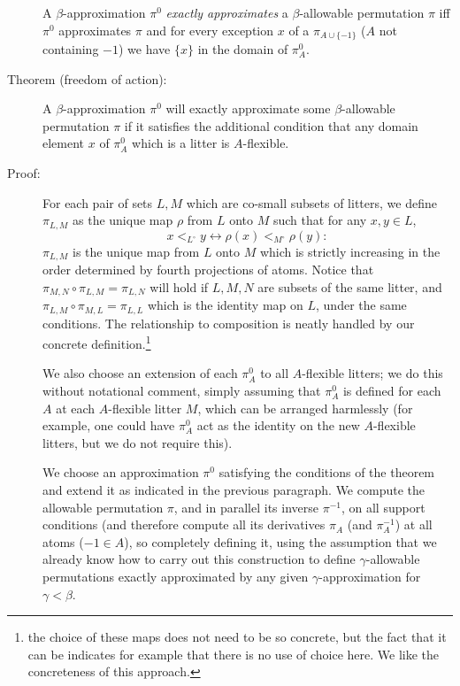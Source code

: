 \documentclass[112pt]{article}
\begin{document}
\begin{description}
A $\beta$-approximation $\pi^0$ {\em exactly approximates\/} a $\beta$-allowable permutation $\pi$ iff $\pi^0$ approximates $\pi$ and
for every exception $x$ of a $\pi_{A \cup \{-1\}}$ ($A$ not containing $-1$) we have $\{x\}$ in the domain of $\pi^0_A$.

\item[Theorem (freedom of action):]  A $\beta$-approximation $\pi^0$ will exactly approximate some $\beta$-allowable permutation $\pi$ if it satisfies the additional condition that any domain element $x$ of $\pi^0_A$ which is a litter is $A$-flexible.

\item[Proof:]   For each pair of sets $L,M$ which are co-small subsets of litters, we define $\pi_{L,M}$ as the unique map $\rho$ from $L$ onto $M$ such
that for any $x,y \in L$, $$x <_{L^{\circ}} y \leftrightarrow \rho(x) <_{M^\circ} \rho(y):$$  $\pi_{L,M}$ is the unique map from $L$ onto $M$ which is strictly increasing in the order determined by fourth projections of atoms.  Notice that \newline $ \pi_{M,N} \circ \pi_{L,M} = \pi_{L,N}$ will hold if $L,M,N$ are subsets of the same litter, and $\pi_{L,M} \circ \pi_{M,L} = \pi_{L,L}$ which is the identity map on $L$, under the same conditions.  The relationship to composition is neatly handled by our concrete definition.\footnote{the choice of these maps does not need to be so concrete, but the fact that it can be indicates for example that there is no use of choice here.  We like the concreteness of this approach.}

We also choose an extension of each  $\pi^0_A$ to all $A$-flexible litters;  we do this without notational comment, simply assuming that $\pi^0_A$ is defined for each $A$ at each $A$-flexible litter $M$, which can be arranged harmlessly
(for example, one could have $\pi^0_A$ act as the identity on the new $A$-flexible litters, but we do not require this).

We choose an approximation $\pi^0$ satisfying the conditions of the theorem and extend it as indicated in the previous paragraph.  We compute the allowable permutation $\pi$, and in parallel its inverse $\pi^{-1}$, on
all support conditions (and therefore compute all its derivatives $\pi_A$ (and $\pi^{-1}_A$) at all atoms ($-1 \in A$), so completely defining it, using the assumption that we already know how to carry out this construction to
define $\gamma$-allowable permutations exactly approximated by any given $\gamma$-approximation for $\gamma<\beta$.


\end{description}
\end{document}
